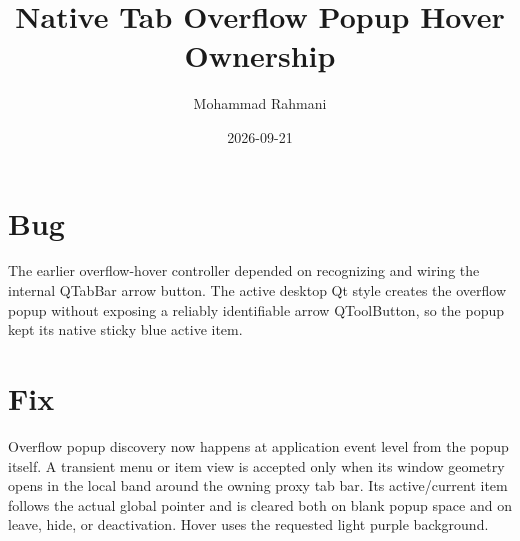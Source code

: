 \documentclass[a4paper]{article}
\title{Native Tab Overflow Popup Hover Ownership}
\date{2026-09-21}
\author{Mohammad Rahmani}
\begin{document}
   \maketitle

   \begin{preview}
      \section{Bug}
      The earlier overflow-hover controller depended on recognizing and wiring
      the internal QTabBar arrow button.  The active desktop Qt style creates
      the overflow popup without exposing a reliably identifiable arrow
      QToolButton, so the popup kept its native sticky blue active item.

      \section{Fix}
      Overflow popup discovery now happens at application event level from the
      popup itself.  A transient menu or item view is accepted only when its
      window geometry opens in the local band around the owning proxy tab bar.
      Its active/current item follows the actual global pointer and is cleared
      both on blank popup space and on leave, hide, or deactivation.  Hover uses
      the requested light purple background.
   \end{preview}

   
   
\end{document}
